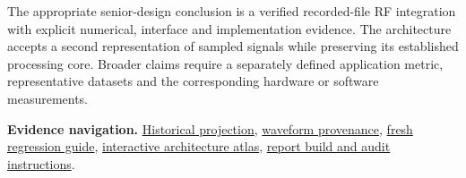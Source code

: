 \documentclass[11pt,letterpaper]{article}
\begin{document}
The appropriate senior-design conclusion is a verified recorded-file RF integration with explicit numerical, interface and implementation evidence. The architecture accepts a second representation of sampled signals while preserving its established processing core. Broader claims require a separately defined application metric, representative datasets and the corresponding hardware or software measurements.

\vfill
\noindent\small\textbf{Evidence navigation.}
\href{evidence/historical_projection.json}{Historical projection},
\href{evidence/waveform_source.json}{waveform provenance},
\href{../../../verification/rf_iq/README.md}{fresh regression guide},
\href{../../architecture/rf_iq/index.html}{interactive architecture atlas},
\href{README.md}{report build and audit instructions}.
\end{document}
